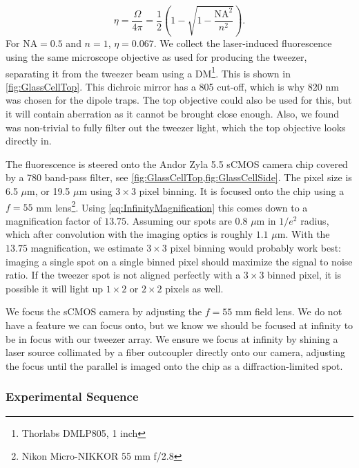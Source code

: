 \begin{equation}\label{eq:Collection}
    \eta = \frac{\Omega}{4\pi} = 
    \frac{1}{2}\left(1-\sqrt{1-\frac{\text{NA}^2}{n^2}}\right).
\end{equation}
For $\text{NA}=0.5$ and $n=1$, $\eta =0.067$. 
We collect the laser-induced fluorescence using the same microscope objective as used for producing the tweezer, separating it from the tweezer beam using a \ac{DM}\footnote{Thorlabs DMLP805, 1 inch}.
This is shown in \cref{fig:GlassCellTop}.
This dichroic mirror has a 805 cut-off, which is why 820 nm was chosen for the dipole traps.
The top objective could also be used for this, but it will contain aberration as it cannot be brought close enough. 
Also, we found was non-trivial to fully filter out the tweezer light, which the top objective looks directly in.

The fluorescence is steered onto the Andor Zyla 5.5 sCMOS camera chip covered by a 780 band-pass filter, see \cref{fig:GlassCellTop,fig:GlassCellSide}.
The pixel size is 6.5 $\mu$m, or 19.5 $\mu$m using $3\times3$ pixel binning. 
It is focused onto the chip using a $f= 55$ mm lens\footnote{Nikon Micro-NIKKOR 55 mm f/2.8}.
Using \cref{eq:InfinityMagnification} this comes down to a magnification factor of $13.75$.
Assuming our spots are $0.8$ $\mu$m in $1/e^2$ radius, which after convolution with the imaging optics is roughly $1.1$ $\mu$m.
With the $13.75$ magnification, we estimate $3\times3$ pixel binning would probably work best: imaging a single spot on a single binned pixel should maximize the signal to noise ratio. 
If the tweezer spot is not aligned perfectly with a $3\times3$ binned pixel, it is possible it will light up $1\times2$ or $2\times2$ pixels as well.

We focus the sCMOS camera by adjusting the $f=55$ mm field lens.
We do not have a feature we can focus onto, but we know we should be focused at infinity to be in focus with our tweezer array. 
We ensure we focus at infinity by shining a laser source collimated by a fiber outcoupler directly onto our camera, adjusting the focus until the parallel is imaged onto the chip as a diffraction-limited spot. 

\subsubsection*{Experimental Sequence}

